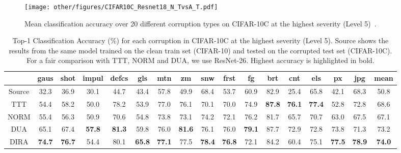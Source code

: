 \begin{figure}[]
    \centering
    \texttt{[image: other/figures/CIFAR10C\_Resnet18\_N\_TvsA\_T.pdf]}
    \caption{Mean classification accuracy over 20 different corruption types on CIFAR-10C at the highest severity (Level 5)~\cite{hendrycks2019benchmarking}.}
    \label{fig:samplesVSaccuracy}
\end{figure}




\begin{table*}[]
    \centering
    \begin{tabular}{c|c c c c c c c c c c c c c c c|c}
                 & gaus & shot & impul & defcs & gls & mtn & zm & snw & frst & fg & brt & cnt & els & px &jpg & mean \\\hline
Source & 32.3 & 36.9 & 30.1 & 44.7 & 43.4 & 57.8 & 49.9 & 68.4 & 53.7 & 60.9 & 82.9 & 25.4 & 65.8 & 42.1 & 68.3 & 50.8 \\
TTT  & 54.4 & 58.2 & 50.0 & 78.2 & 53.9 & 77.0 & 76.1 & 70.1 & 70.0 & 74.9 & \textbf{87.8} & \textbf{76.1} & \textbf{77.4} & 52.8 & 72.8 & 68.6 \\
NORM  & 55.4 & 56.3 & 50.9 & 70.6 & 54.8 & 73.8 & 73.1 & 74.2 & 72.1 & 76.2 & 81.7 & 65.7 & 70.7 & 63.0 & 67.5 & 67.1 \\
DUA  & 65.1 & 67.4 & \textbf{57.8} & \textbf{81.3} & 59.8 & 76.0 & \textbf{81.6} & 76.1 & 76.0 & \textbf{79.1} & 87.7 & 72.9 & 72.8 & 73.8 & 71.3 & 73.2 \\
DIRA  & \textbf{74.7} & \textbf{76.7} & 54.4 & 80.1 & \textbf{65.8} & \textbf{77.1} & 77.5 & \textbf{78.4} & \textbf{76.8} & 72.1 & 84.2 & 60.4 & 75.1 & \textbf{77.5} & \textbf{78.9} & \textbf{74.0} \\ %

    \end{tabular}
    \caption{Top-1 Classification Accuracy (\%) for each corruption in CIFAR-10C at the highest severity (Level 5). Source shows the results from the same model trained on the clean train set (CIFAR-10) and tested on the corrupted test set (CIFAR-10C). For a fair comparison with TTT, NORM and DUA, we use ResNet-26. Highest accuracy is highlighted in bold.}
    \label{tab:SOTA_CIFAR-10C_results}
\end{table*}

